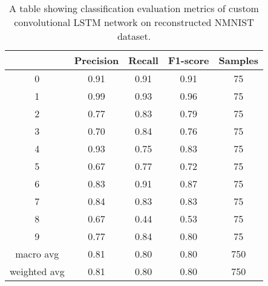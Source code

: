 \begin{table}[htb]
    \centering
    \begin{tabular}{|| c | c | c | c | c ||}
        \hline
             & Precision & Recall & F1-score & Samples \\
        \hline \hline
        0            & 0.91 & 0.91 & 0.91 & 75  \\
        \hline
        1            & 0.99 & 0.93 & 0.96 & 75  \\
        \hline
        2            & 0.77 & 0.83 & 0.79 & 75  \\
        \hline
        3            & 0.70 & 0.84 & 0.76 & 75  \\
        \hline
        4            & 0.93 & 0.75 & 0.83 & 75  \\
        \hline
        5            & 0.67 & 0.77 & 0.72 & 75  \\
        \hline
        6            & 0.83 & 0.91 & 0.87 & 75  \\
        \hline
        7            & 0.84 & 0.83 & 0.83 & 75  \\
        \hline
        8            & 0.67 & 0.44 & 0.53 & 75  \\
        \hline
        9            & 0.77 & 0.84 & 0.80 & 75  \\
        \hline
        macro avg    & 0.81 & 0.80 & 0.80 & 750 \\
        \hline
        weighted avg & 0.81 & 0.80 & 0.80 & 750 \\
        \hline
    \end{tabular}
    \caption{A table showing classification evaluation metrics of custom convolutional LSTM network on reconstructed NMNIST dataset.}
    \label{tab:custom_conv_lstm_nmnist_recon_evaluation_metrics}
\end{table}

